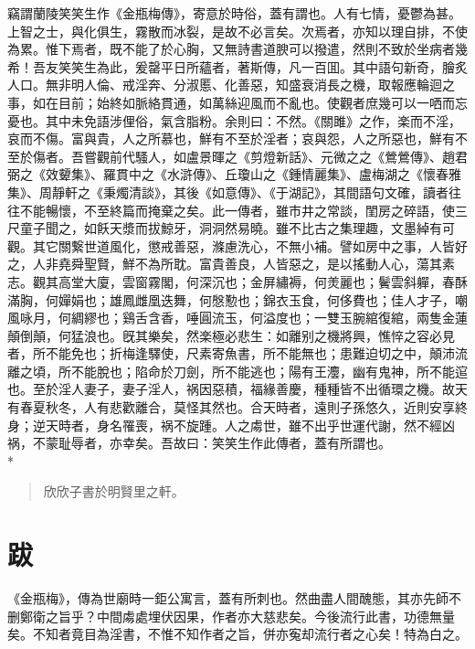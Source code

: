 竊謂蘭陵笑笑生作《金瓶梅傳》，寄意於時俗，蓋有謂也。人有七情，憂鬱為甚。上智之士，與化俱生，霧散而冰裂，是故不必言矣。次焉者，亦知以理自排，不使為累。惟下焉者，既不能了於心胸，又無詩書道腴可以撥遣，然則不致於坐病者幾希！吾友笑笑生為此，爰罄平日所蘊者，著斯傳，凡一百囬。其中語句新奇，膾炙人口。無非明人倫、戒淫奔、分淑慝、化善惡，知盛衰消長之機，取報應輪迴之事，如在目前；始終如脈絡貫通，如萬絲迎風而不亂也。使觀者庶幾可以一哂而忘憂也。其中未免語涉俚俗，氣含脂粉。余則曰：不然。《關雎》之作，楽而不淫，哀而不傷。富與貴，人之所慕也，鮮有不至於淫者；哀與怨，人之所惡也，鮮有不至於傷者。吾嘗觀前代騷人，如盧景暉之《剪燈新話》、元微之之《鶯鶯傳》、趙君弼之《效顰集》、羅貫中之《水滸傳》、丘瓊山之《鍾情麗集》、盧梅湖之《懷春雅集》、周靜軒之《秉燭清談》，其後《如意傳》、《于湖記》，其間語句文確，讀者往往不能暢懷，不至終篇而掩棄之矣。此一傳者，雖市井之常談，閨房之碎語，使三尺童子聞之，如飫天漿而拔鯨牙，洞洞然易曉。雖不比古之集理趣，文墨綽有可觀。其它關繋世道風化，懲戒善惡，滌慮洗心，不無小補。譬如房中之事，人皆好之，人非堯舜聖賢，鮮不為所耽。富貴善良，人皆惡之，是以搖動人心，蕩其素志。觀其高堂大廈，雲窗霧閣，何深沉也；金屏繡褥，何羙麗也；鬢雲斜軃，春酥滿胸，何嬋娟也；雄鳳雌凰迭舞，何慇懃也；錦衣玉食，何侈費也；佳人才子，嘲風咏月，何綢繆也；鷄舌含香，唾圓流玉，何溢度也；一雙玉腕綰復綰，兩隻金蓮顛倒顛，何猛浪也。旣其樂矣，然楽極必悲生：如離别之機將興，憔悴之容必見者，所不能免也；折梅逢驛使，尺素寄魚書，所不能無也；患難迫切之中，顛沛流離之頃，所不能脫也；陷命於刀劍，所不能逃也；陽有王灋，幽有鬼神，所不能逭也。至於淫人妻子，妻子淫人，祸因惡積，福緣善慶，種種皆不出循環之機。故天有春夏秋冬，人有悲歡離合，莫怪其然也。合天時者，遠則子孫悠久，近則安享終身；逆天時者，身名罹喪，祸不旋踵。人之䖏世，雖不出乎世運代謝，然不經凶祸，不蒙耻辱者，亦幸矣。吾故曰：笑笑生作此傳者，蓋有所謂也。\\*

\nopagebreak[4]\begin{quotation}\begin{flushright}欣欣子書於明賢里之軒。\end{flushright}\end{quotation}

\chapter*{跋}
\thispagestyle{empty}

《金瓶梅》，傳為世廟時一鉅公寓言，蓋有所刺也。然曲盡人間醜態，其亦先師不删鄭衛之旨乎？中間䖏處埋伏因果，作者亦大慈悲矣。今後流行此書，功德無量矣。不知者竟目為淫書，不惟不知作者之旨，併亦寃却流行者之心矣！特為白之。

